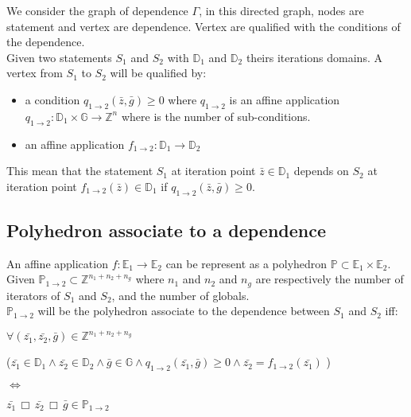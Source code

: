 We consider the graph of dependence $\Gamma$, in this directed graph, nodes are statement and vertex are dependence.
Vertex are qualified with the conditions of the dependence.\\
Given two statements $S_{1}$ and $S_{2}$ with $\mathbb{D}_{1}$ and $\mathbb{D}_{2}$ theirs iterations domains.
A vertex from $S_{1}$ to $S_{2}$ will be qualified by:
\begin{itemize}
	\item a condition $q_{1 \rightarrow 2}(\bar{z}, \bar{g}) \geq 0$ where $q_{1 \rightarrow 2}$ is an affine application
		$q_{1 \rightarrow 2}: \mathbb{D}_{1} \times \mathbb{G} \rightarrow \mathbb{Z}^{n}$ where is the number of
		sub-conditions.
	\item an affine application $f_{1 \rightarrow 2} : \mathbb{D}_{1} \rightarrow \mathbb{D}_{2}$
\end{itemize}
This mean that the statement $S_{1}$ at iteration point $\bar{z} \in \mathbb{D}_{1}$ depends on $S_{2}$ at iteration point
$f_{1 \rightarrow 2}(\bar{z}) \in \mathbb{D}_{1}$ if $q_{1 \rightarrow 2}(\bar{z}, \bar{g}) \geq 0$.\\

		\subsection{Polyhedron associate to a dependence}

An affine application $f: \mathbb{E}_{1} \rightarrow \mathbb{E}_{2}$ can be represent as a polyhedron
$\mathbb{P} \subset \mathbb{E}_{1} \times \mathbb{E}_{2}$.\\
Given $\mathbb{P}_{1 \rightarrow 2} \subset \mathbb{Z}^{n_{1} + n_{2} + n_{g}}$ where $n_{1}$ and $n_{2}$ and $n_{g}$ are
respectively the number of iterators of $S_{1}$ and $S_{2}$, and the number of globals.\\

$\mathbb{P}_{1 \rightarrow 2}$ will be the polyhedron associate to the dependence between $S_{1}$ and $S_{2}$ iff:
%
%
%
\begin{center}
$\forall (\bar{z_{1}}, \bar{z_{2}}, \bar{g}) \in \mathbb{Z}^{n_{1} + n_{2} + n_{g}}$

($\bar{z_{1}} \in \mathbb{D}_{1} \wedge \bar{z_{2}} \in \mathbb{D}_{2} \wedge \bar{g} \in \mathbb{G} \wedge q_{1 \rightarrow 2}(\bar{z_{1}}, \bar{g}) \geq 0 \wedge \bar{z_{2}} = f_{1 \rightarrow 2}(\bar{z_{1}})$ )

$\Leftrightarrow$

$ \bar{z_{1}} \,\Box\, \bar{z_{2}} \,\Box\, \bar{g} \in \mathbb{P}_{1 \rightarrow 2}$
\end{center}

